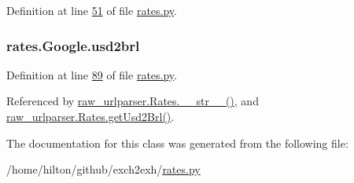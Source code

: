 Definition at line \hyperlink{rates_8py_source_l00051}{51} of file \hyperlink{rates_8py_source}{rates.\+py}.

\subsubsection[{\texorpdfstring{usd2brl}{usd2brl}}]{\setlength{\rightskip}{0pt plus 5cm}rates.\+Google.\+usd2brl}\hypertarget{classrates_1_1_google_a94c28f6d60d5d6afc075416d7378471c}{}\label{classrates_1_1_google_a94c28f6d60d5d6afc075416d7378471c}


Definition at line \hyperlink{rates_8py_source_l00089}{89} of file \hyperlink{rates_8py_source}{rates.\+py}.



Referenced by \hyperlink{raw__urlparser_8py_source_l00038}{raw\+\_\+urlparser.\+Rates.\+\_\+\+\_\+str\+\_\+\+\_\+()}, and \hyperlink{raw__urlparser_8py_source_l00032}{raw\+\_\+urlparser.\+Rates.\+get\+Usd2\+Brl()}.



The documentation for this class was generated from the following file\+:\begin{DoxyCompactItemize}
\item 
/home/hilton/github/exch2exh/\hyperlink{rates_8py}{rates.\+py}\end{DoxyCompactItemize}
